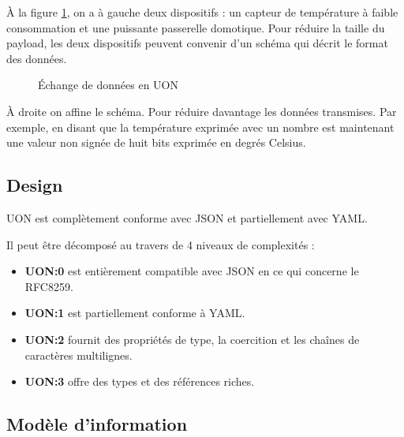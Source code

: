 \documentclass[
    iict, %
    il, %
]{heig-tb}
\begin{document}
\vspace{\parskip}

À la figure \ref{data-exchange}, on a à gauche deux dispositifs : un capteur de température à faible consommation
et une puissante passerelle domotique. Pour réduire la taille du payload, les deux dispositifs peuvent convenir d'un schéma qui décrit le format des données.

\begin{figure}[H]
    \begin{center}
    \end{center}
    \caption[Échange de données en UON]{\label{data-exchange}Échange de données en UON}
\end{figure}

À droite on affine le schéma. Pour réduire davantage les données transmises.
Par exemple, en disant que la température exprimée avec un nombre est maintenant une valeur non signée de huit bits exprimée en degrés Celsius.

\subsection{Design}
UON est complètement conforme avec JSON et partiellement avec YAML.

Il peut être décomposé au travers de 4 niveaux de complexités :
\begin{itemize}
    \item \textbf{UON:0} est entièrement compatible avec JSON en ce qui concerne le RFC8259.
    \item \textbf{UON:1} est partiellement conforme à YAML.
    \item \textbf{UON:2} fournit des propriétés de type, la coercition et les chaînes de caractères multilignes.
    \item \textbf{UON:3} offre des types et des références riches.
\end{itemize}

\subsection{Modèle d'information}
\end{document}

